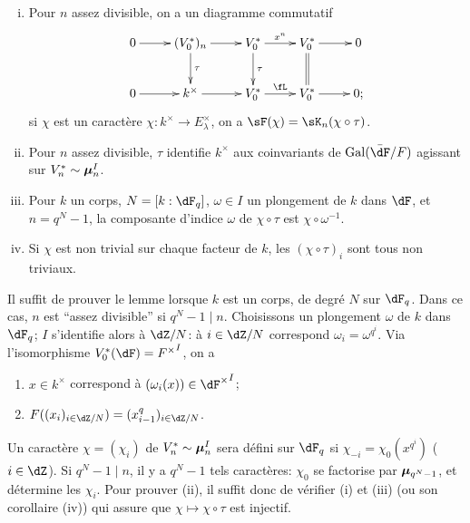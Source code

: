 \begin{lemma_}\label{VI:4-9}
\begin{enumerate}[(i)]
  \item Pour $n$ assez divisible, on a un diagramme commutatif 
    \[\xymatrix{
      0 \ar[r] 
        & (V_0^\ast)_n \ar[r] \ar[d]^-\tau 
        & V_0^\ast \ar[r]^-{x^n} \ar[d]^-\tau 
        & V_0^\ast \ar[r] \ar@{=}[d] 
        & 0 \\
      0 \ar[r] 
        & k^\times \ar[r] 
        & V_0^\ast \ar[r]^-\fL 
        & V_0^\ast \ar[r] 
        & 0 \text{;} 
    }\]
    si $\chi$ est un caract\`ere $\chi:k^\times \to E_\lambda^\times$, on a 
    $\sF(\chi) = \sK_n(\chi\circ\tau)$. 
  \item Pour $n$ assez divisible, $\tau$ identifie $k^\times$ aux coinvariants 
    de $\gal(\bar\dF/F)$ agissant sur $V_n^\ast\sim {\bm\mu}_n^I$. 
  \item Pour $k$ un corps, $N=[k:\dF_q]$, $\omega\in I$ un plongement de $k$ 
    dans $\dF$, et $n=q^N-1$, la composante d'indice $\omega$ de 
    $\chi\circ\tau$ est $\chi\circ \omega^{-1}$. 
  \item Si $\chi$ est non trivial sur chaque facteur de $k$, les 
    $(\chi\circ \tau)_i$ sont tous non triviaux. 
\end{enumerate}
\end{lemma_}

Il suffit de prouver le lemme lorsque $k$ est un corps, de degr\'e $N$ sur 
$\dF_q$. Dans ce cas, $n$ est ``assez divisible'' si $q^N-1\mid n$. 
Choisissons un plongement $\omega$ de $k$ dans $\dF_q$; $I$ s'identifie alors 
\`a $\dZ/N$: \`a $i\in \dZ/N$ correspond $\omega_i=\omega^{q^i}$. Via 
l'isomorphisme $V_0^\ast(\dF) = {F^\times}^I$, on a 
\begin{enumerate}[\indent a)]
  \item $x\in k^\times$ correspond \`a $(\omega_i(x))\in {\dF^\times}^I$; 
  \item $F((x_i)_{i\in \dZ/N})=(x_{i-1}^q)_{i\in \dZ/N}$. 
\end{enumerate}

Un caract\`ere $\chi=(\chi_i)$ de $V_n^\ast\sim {\bm\mu}_n^I$ sera d\'efini sur 
$\dF_q$ si $\chi_{-i} =\chi_0(x^{q^i})$ ($i\in \dZ$). Si $q^N-1\mid n$, il y a 
$q^N-1$ tels caract\`eres: $\chi_0$ se factorise par ${\bm\mu}_{q^N-1}$, et 
d\'etermine les $\chi_i$. Pour prouver (ii), il suffit donc de v\'erifier (i) 
et (iii) (ou son corollaire (iv)) qui assure que $\chi\mapsto \chi\circ \tau$ 
est injectif. 

